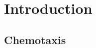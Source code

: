 \documentclass[../main.tex]{subfiles}
\begin{document}
\section{Introduction}

\subsection{Chemotaxis}
\end{document}
